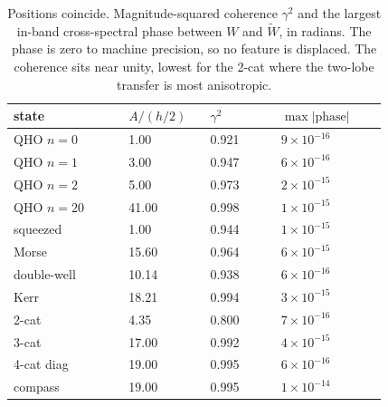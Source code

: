 \documentclass[%
  aps, amsmath, amssymb, onecolumn, 11pt
]{revtex4-2}
\begin{document}
\begin{table}[ht]
\centering
\renewcommand{\arraystretch}{1.2}
\begin{tabular}{@{}p{0.26\linewidth} p{0.16\linewidth} p{0.16\linewidth} p{0.24\linewidth}@{}}
\toprule
state & $A/(h/2)$ & $\gamma^2$ & $\max|\mathrm{phase}|$ \\
\midrule
QHO $n=0$    & 1.00  & 0.921 & $9\times10^{-16}$ \\
QHO $n=1$    & 3.00  & 0.947 & $6\times10^{-16}$ \\
QHO $n=2$    & 5.00  & 0.973 & $2\times10^{-15}$ \\
QHO $n=20$   & 41.00 & 0.998 & $1\times10^{-15}$ \\
squeezed     & 1.00  & 0.944 & $1\times10^{-15}$ \\
Morse        & 15.60 & 0.964 & $6\times10^{-15}$ \\
double-well  & 10.14 & 0.938 & $6\times10^{-16}$ \\
Kerr         & 18.21 & 0.994 & $3\times10^{-15}$ \\
2-cat        & 4.35  & 0.800 & $7\times10^{-16}$ \\
3-cat        & 17.00 & 0.992 & $4\times10^{-15}$ \\
4-cat diag   & 19.00 & 0.995 & $6\times10^{-16}$ \\
compass      & 19.00 & 0.995 & $1\times10^{-14}$ \\
\bottomrule
\end{tabular}
\caption{Positions coincide. Magnitude-squared coherence $\gamma^2$ and the
largest in-band cross-spectral phase between $W$ and $\widetilde W$, in radians.
The phase is zero to machine precision, so no feature is displaced. The
coherence sits near unity, lowest for the 2-cat where the two-lobe transfer is
most anisotropic.}
\label{tab:coherence}
\end{table}
\end{document}
